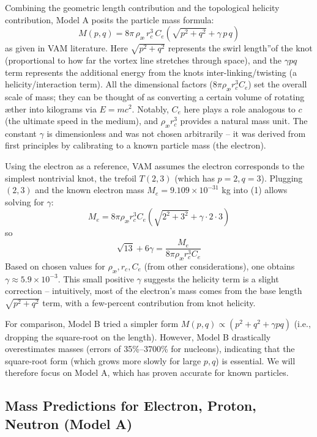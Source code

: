 Combining the geometric length contribution and the topological helicity contribution, Model A posits the particle mass formula:
\begin{equation}
    \boxed{  M(p,q) = 8\pi\,\rho_{\text{\ae}}\,r_c^3\,C_e \left(\sqrt{p^2 + q^2} + \gamma\, p\,q\right)     }
\end{equation}
as given in VAM literature. Here $\sqrt{p^2+q^2}$ represents the \grqq swirl length\textquotedblright of the knot (proportional to how far the vortex line stretches through space), and the $\gamma p q$ term represents the additional energy from the knot\rqs s inter-linking/twisting (a helicity/interaction term). All the dimensional factors ($8\pi \rho_{\text{\ae}} r_c^3 C_e$) set the overall scale of mass; they can be thought of as converting a certain volume of rotating æther into kilograms via $E=mc^2$. Notably, $C_e$ here plays a role analogous to $c$ (the ultimate speed in the medium), and $\rho_{\text{\ae}} r_c^3$ provides a natural mass unit. The constant $\gamma$ is dimensionless and was not chosen arbitrarily – it was derived from first principles by calibrating to a known particle mass (the electron).

Using the electron as a reference, VAM assumes the electron corresponds to the simplest nontrivial knot, the trefoil $T(2,3)$ (which has $p=2,q=3$). Plugging $(2,3)$ and the known electron mass $M_e = 9.109\times10^{-31}$ kg into (1) allows solving for $\gamma$:
\[
    M_e = 8\pi \rho_{\text{\ae}} r_c^3 C_e \left(\sqrt{2^2+3^2} + \gamma \cdot 2\cdot3\right)
\]
so
\[
    \sqrt{13} + 6\gamma = \frac{M_e}{8\pi \rho_{\text{\ae}} r_c^3 C_e}
\]
Based on chosen values for $\rho_{\text{\ae}}, r_c, C_e$ (from other considerations), one obtains $\gamma \approx 5.9\times10^{-3}$. This small positive $\gamma$ suggests the helicity term is a slight correction -- intuitively, most of the electron's mass comes from the base length $\sqrt{p^2+q^2}$ term, with a few-percent contribution from knot helicity.

For comparison, Model B tried a simpler form $M(p,q) \propto (p^2 + q^2 + \gamma p q)$ (i.e., dropping the square-root on the length). However, Model B drastically overestimates masses (errors of 35\%--3700\% for nucleons), indicating that the square-root form (which grows more slowly for large $p,q$) is essential. We will therefore focus on Model A, which has proven accurate for known particles.

\subsection{Mass Predictions for Electron, Proton, Neutron (Model A)}

